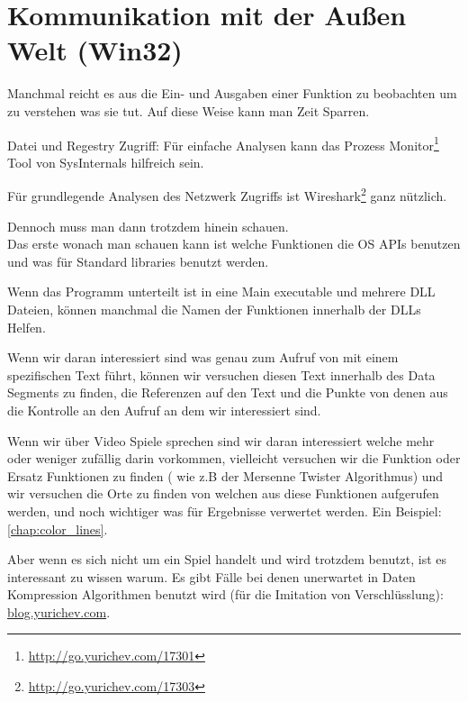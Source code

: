 \section{Kommunikation mit der Außen Welt (Win32)}

Manchmal reicht es aus die Ein- und Ausgaben einer Funktion zu beobachten um zu verstehen was sie tut.
Auf diese Weise kann man Zeit Sparren.

Datei und Regestry Zugriff:
Für einfache Analysen kann das Prozess Monitor\footnote{\url{http://go.yurichev.com/17301}}
Tool von SysInternals hilfreich sein.

Für grundlegende Analysen des Netzwerk Zugriffs ist Wireshark\footnote{\url{http://go.yurichev.com/17303}} ganz nützlich.

Dennoch muss man dann trotzdem hinein schauen. %
\\
Das erste wonach man schauen kann ist welche Funktionen die \ac{OS} \ac{API}s benutzen und was für Standard libraries
benutzt werden. 

Wenn das Programm unterteilt ist in eine Main executable und mehrere DLL Dateien, können manchmal die Namen der Funktionen innerhalb
der DLLs Helfen. 

Wenn wir daran interessiert sind was genau zum Aufruf von  mit einem spezifischen Text führt,
können wir versuchen diesen Text innerhalb des Data Segments zu finden, die Referenzen auf den Text und die 
Punkte von denen aus die Kontrolle an den  Aufruf an dem wir interessiert sind.

Wenn wir über Video Spiele sprechen sind wir daran interessiert welche mehr oder weniger zufällig darin vorkommen,
vielleicht versuchen wir die \rand Funktion oder Ersatz Funktionen zu finden ( wie z.B der Mersenne Twister Algorithmus) 
und wir versuchen die Orte zu finden von welchen aus diese Funktionen aufgerufen werden, und noch wichtiger was für
Ergebnisse verwertet werden. 
Ein Beispiel: \ref{chap:color_lines}.

Aber wenn es sich nicht um ein Spiel handelt und \rand wird trotzdem benutzt, ist es interessant zu wissen warum.
Es gibt Fälle bei denen unerwartet \rand in Daten Kompression Algorithmen benutzt wird (für die Imitation von Verschlüsslung):
\href{http://go.yurichev.com/17221}{blog.yurichev.com}.

